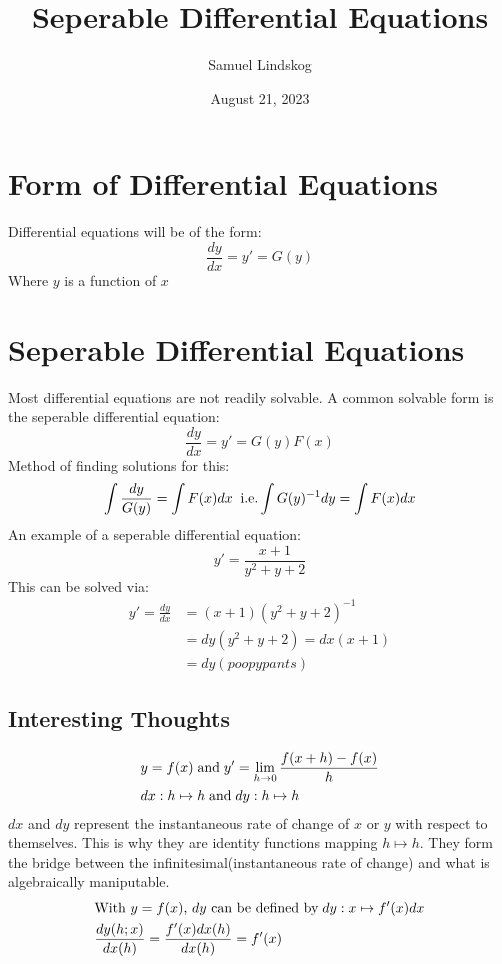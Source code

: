 \documentclass{article}
\begin{document}
\title{Seperable Differential Equations}
\author{Samuel Lindskog}
\date{August 21, 2023}
\maketitle
\renewcommand{\abstractname}{}

\setcounter{secnumdepth}{2}

\section{Form of Differential Equations}
Differential equations will be of the form:
\begin{displaymath}
	\frac{dy}{dx}=y'=G(y)
\end{displaymath}
Where \(y\) is a function of \(x\)

\section{Seperable Differential Equations}
Most differential equations are not readily solvable. A common solvable form is the seperable differential equation:
\begin{displaymath}
	\frac{dy}{dx}=y'=G(y)F(x)
\end{displaymath}
Method of finding solutions for this:
\begin{displaymath}
	\int\frac{dy}{G(y)}=\int F(x)dx\text{\;\;i.e.}\int G(y)^{-1}dy=\int F(x)dx
\end{displaymath}
An example of a seperable differential equation:
\begin{displaymath}
	y'=\frac{x+1}{y^2+y+2}
\end{displaymath}
This can be solved via:
\begin{align*}
	y'=\frac{dy}{dx}&=(x+1)(y^2+y+2)^{-1}\\
	&=dy(y^2+y+2)=dx(x+1)\\
	&=dy(poopypants)
\end{align*}
\subsection*{Interesting Thoughts}
\begin{align*}
	&y=f(x)\text{\;and\;}y'=\lim_{h\rightarrow 0}\frac{f(x+h)-f(x)}{h}\\
	&dx:h\mapsto h\text{\;and\;}dy:h\mapsto h
\end{align*}
\(dx\) and \(dy\) represent the instantaneous rate of change of \(x\) or \(y\) with respect to themselves. This is why they are identity functions mapping \(h\mapsto h\). They form the bridge between the infinitesimal(instantaneous rate of change) and what is algebraically maniputable.
\begin{align*}
	&\text{With \(y=f(x)\), \(dy\) can be defined by\;} dy:x\mapsto f'(x)dx\\
	&\frac{dy(h;x)}{dx(h)}=\frac{f'(x)dx(h)}{dx(h)}=f'(x)
\end{align*}
\end{document}
